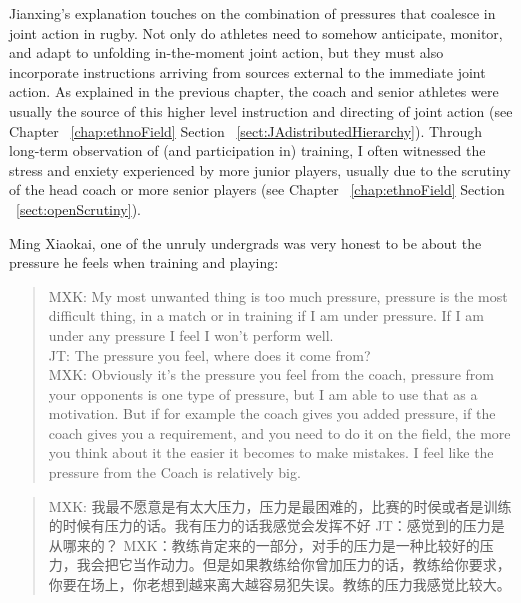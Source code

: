 \begin{CJK}{UTF8}{gbsn}
Jianxing's explanation touches on the combination of pressures that coalesce in joint action in rugby.  Not only do athletes need to somehow anticipate, monitor, and adapt to unfolding in-the-moment joint action, but they must also incorporate instructions arriving from sources external to the immediate joint action.  As explained in the previous chapter, the coach and senior athletes were usually the source of this higher level instruction and directing of joint action (see Chapter ~\ref{chap:ethnoField} Section ~\ref{sect:JAdistributedHierarchy}).  Through long-term observation of (and participation in) training, I often witnessed the stress and enxiety experienced by more junior players, usually due to the scrutiny of the head coach or more senior players (see Chapter ~\ref{chap:ethnoField} Section ~\ref{sect:openScrutiny}).

Ming Xiaokai, one of the unruly undergrads was very honest to be about the pressure he feels when training and playing:

    \begin{quote}
      MXK: My most unwanted thing is too much pressure, pressure is the most difficult thing, in a match or in training if I am under pressure.  If I am under any pressure I feel I won’t perform well. \\
      JT: The pressure you feel, where does it come from? \\
      MXK: Obviously it's the pressure you feel from the coach, pressure from your opponents is one type of pressure, but I am able to use that as a motivation. But if for example the coach gives you added pressure, if the coach gives you a requirement, and you need to do it on the field, the more you think about it the easier it becomes to make mistakes.  I feel like the pressure from the Coach is relatively big.
    \end{quote}

    \begin{quote}
      MXK: 我最不愿意是有太大压力，压力是最困难的，比赛的时侯或者是训练的时候有压力的话。我有压力的话我感觉会发挥不好
      JT：感觉到的压力是从哪来的？
      MXK：教练肯定来的一部分，对手的压力是一种比较好的压力，我会把它当作动力。但是如果教练给你曾加压力的话，教练给你要求，你要在场上，你老想到越来离大越容易犯失误。教练的压力我感觉比较大。
    \end{quote}


\end{CJK}
